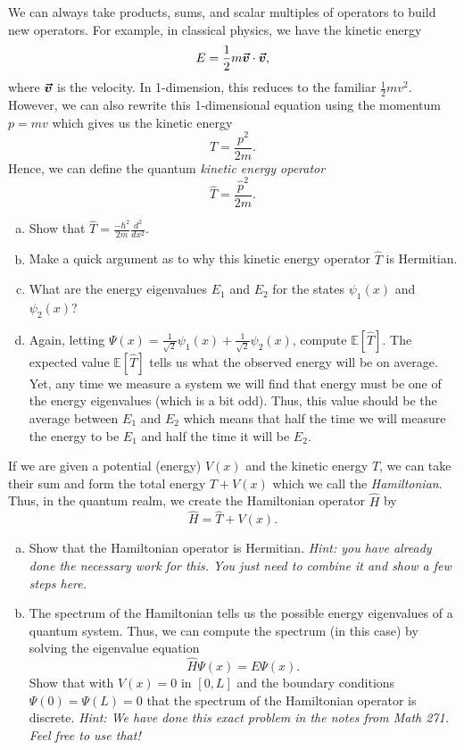 \documentclass[12pt]{article} %
\begin{document}
\begin{problem}
	We can always take products, sums, and scalar multiples of operators to build new operators.  For example, in classical physics, we have the kinetic energy
	\[
	E=\frac{1}{2}m \boldsymbol{\vec{v}} \cdot \boldsymbol{\vec{v}},
	\]
	where $\boldsymbol{\vec{v}}$ is the velocity. In 1-dimension, this reduces to the familiar $\frac{1}{2}mv^2$.  However, we can also rewrite this 1-dimensional equation using the momentum $p=mv$ which gives us the kinetic energy
	\[
	T=\frac{p^2}{2m}.
	\]
	Hence, we can define the quantum \emph{kinetic energy operator}
	\[
	\hat{T}=\frac{\hat{p}^2}{2m}.
	\]
	\begin{enumerate}[(a)]
		\item Show that $\hat{T} = \frac{-\hbar^2}{2m}\frac{d^2}{dx^2}$.
		\item Make a quick argument as to why this kinetic energy operator $\hat{T}$ is Hermitian.
		\item What are the energy eigenvalues $E_1$ and $E_2$ for the states $\psi_1(x)$ and $\psi_2(x)$?
		\item Again, letting $\Psi(x)=\frac{1}{\sqrt{2}}\psi_1(x)+\frac{1}{\sqrt{2}}\psi_2(x)$, compute $\mathbb{E}[\hat{T}]$. The expected value $\mathbb{E}[\hat{T}]$ tells us what the observed energy will be on average. Yet, any time we measure a system we will find that energy must be one of the energy eigenvalues (which is a bit odd). Thus, this value should be the average between $E_1$ and $E_2$ which means that half the time we will measure the energy to be $E_1$ and half the time it will be $E_2$.
	\end{enumerate}	
\end{problem}

\begin{problem}
If we are given a potential (energy) $V(x)$ and the kinetic energy $T$, we can take their sum and form the total energy $T+V(x)$ which we call the \emph{Hamiltonian}.  Thus, in the quantum realm, we create the Hamiltonian operator $\hat{H}$ by
\[
\hat{H}=\hat{T}+V(x).
\]
\begin{enumerate}[(a)]
	\item Show that the Hamiltonian operator is Hermitian. \emph{Hint: you have already done the necessary work for this. You just need to combine it and show a few steps here.}
	\item The spectrum of the Hamiltonian tells us the possible energy eigenvalues of a quantum system. Thus, we can compute the spectrum (in this case) by solving the eigenvalue equation
	\[
	\hat{H}\Psi(x)=E\Psi(x).
	\]
	Show that with $V(x)=0$ in $[0,L]$ and the boundary conditions $\Psi(0)=\Psi(L)=0$ that the spectrum of the Hamiltonian operator is discrete.  \emph{Hint: We have done this exact problem in the notes from Math 271. Feel free to use that!}
\end{enumerate}
\end{problem}
\end{document}
